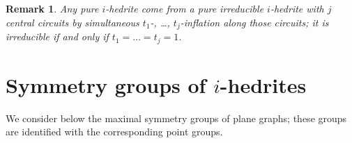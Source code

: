 \documentclass[12pt]{article}
\newtheorem{remark}{Remark}
\begin{document}
\begin{remark}

Any pure $i$-hedrite come from a pure irreducible $i$-hedrite with $j$ central circuits by simultaneous $t_1$-, \dots, $t_j$-inflation along those circuits; it is irreducible if and only if $t_1=\dots=t_j=1$.

\end{remark}





\section{Symmetry groups of $i$-hedrites}
We consider below the maximal symmetry groups of plane graphs; these groups are identified with the corresponding point groups.



%
%
%
\end{document}
